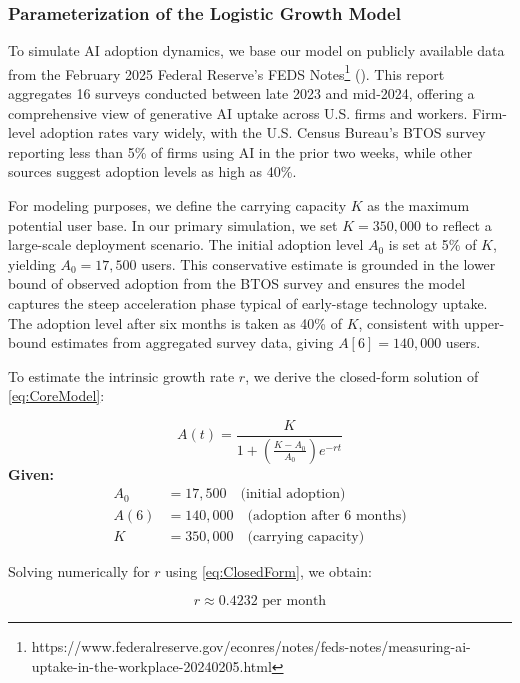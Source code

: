 \documentclass[10pt,twocolumn]{article}
\begin{document}
\subsubsection{Parameterization of the Logistic Growth Model}

To simulate AI adoption dynamics, we base our model on publicly available data from the February 2025 Federal Reserve's FEDS Notes\footnote{{https://www.federalreserve.gov/econres/notes/feds-notes/measuring-ai-uptake-in-the-workplace-20240205.html}} (\cite{FEDSNotes2025}). This report aggregates 16 surveys conducted between late 2023 and mid-2024, offering a comprehensive view of generative AI uptake across U.S. firms and workers. Firm-level adoption rates vary widely, with the U.S. Census Bureau's BTOS survey reporting less than 5\% of firms using AI in the prior two weeks, while other sources suggest adoption levels as high as 40\%.

For modeling purposes, we define the carrying capacity \( K \) as the maximum potential user base. In our primary simulation, we set \( K = 350{,}000 \) to reflect a large-scale deployment scenario. The initial adoption level \( A_0 \) is set at 5\% of \( K \), yielding \( A_0 = 17{,}500 \) users. This conservative estimate is grounded in the lower bound of observed adoption from the BTOS survey and ensures the model captures the steep acceleration phase typical of early-stage technology uptake. The adoption level after six months is taken as 40\% of \( K \), consistent with upper-bound estimates from aggregated survey data, giving \( A[6] = 140{,}000 \) users.

To estimate the intrinsic growth rate \( r \), we derive the closed-form solution of \autoref{eq:CoreModel}:

\begin{equation}
	A(t) = \frac{K}{1 + \left( \frac{K - A_0}{A_0} \right) e^{-rt}}
\label{eq:ClosedForm}
\end{equation}
\textbf{Given:}
\begin{align*}
A_0 &= 17{,}500 \quad \text{(initial adoption)} \\
A(6) &= 140{,}000 \quad \text{(adoption after 6 months)} \\
K &= 350{,}000 \quad \text{(carrying capacity)}
\end{align*}

Solving numerically for \( r \) using \autoref{eq:ClosedForm}, we obtain:


\[
r \approx 0.4232 \text{ per month}
\]	
\end{document}
